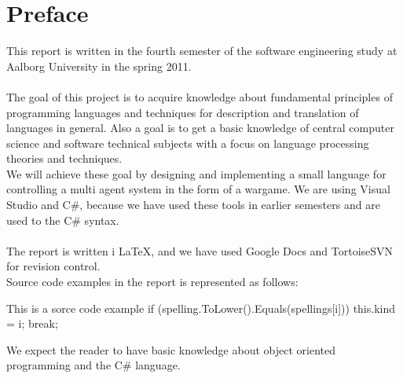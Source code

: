 \chapter*{Preface}
This report is written in the fourth semester of the software engineering study at Aalborg University in the spring 2011.
\\
\\
The goal of this project is to acquire knowledge about fundamental principles of programming languages and techniques for description and translation of languages in general. Also a goal is to get a basic knowledge of central computer science and software technical subjects with a focus on language processing theories and techniques.\\ \indent
  We will achieve these goal by designing and implementing a small language for controlling a multi agent system in the form of a wargame. We are using Visual Studio and C\#, because we have used these tools in earlier semesters and are used to the C\# syntax.
	\\
	\\
	The report is written i \LaTeX, and we have used Google Docs and TortoiseSVN for revision control.
	\\

Source code examples in the report is represented as follows:
\begin{source}{This is a sorce code example}{}
if (spelling.ToLower().Equals(spellings[i]))
	{
		this.kind = i;
		break;
	}
\end{source}

We expect the reader to have basic knowledge about object oriented programming and the C\# language.
